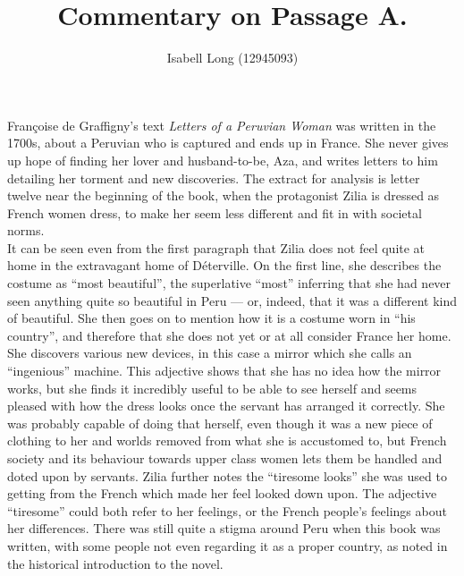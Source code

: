 \documentclass[12pt,a4paper]{article}
\begin{document}
\title{Commentary on Passage A.}
\author{Isabell Long (12945093)}
\maketitle

Françoise de Graffigny's text \textit{Letters of a Peruvian Woman} was written in the 1700s, about a Peruvian who is captured and ends up in France. She never gives up hope of finding her lover and husband-to-be, Aza, and writes letters to him detailing her torment and new discoveries. The extract for analysis is letter twelve near the beginning of the book, when the protagonist Zilia is dressed as French women dress, to make her seem less different and fit in with societal norms.\\

It can be seen even from the first paragraph that Zilia does not feel quite at home in the extravagant home of Déterville. On the first line, she describes the costume as ``most beautiful'', the superlative ``most'' inferring that she had never seen anything quite so beautiful in Peru --- or, indeed, that it was a different kind of beautiful. She then goes on to mention how it is a costume worn in ``his country'', and therefore that she does not yet or at all consider France her home. She discovers various new devices, in this case a mirror which she calls an ``ingenious'' machine. This adjective shows that she has no idea how the mirror works, but she finds it incredibly useful to be able to see herself and seems pleased with how the dress looks once the servant has arranged it correctly. She was probably capable of doing that herself, even though it was a new piece of clothing to her and worlds removed from what she is accustomed to, but French society and its behaviour towards upper class women lets them be handled and doted upon by servants. Zilia further notes the ``tiresome looks'' she was used to getting from the French which made her feel looked down upon. The adjective ``tiresome'' could both refer to her feelings, or the French people's feelings about her differences. There was still quite a stigma around Peru when this book was written, with some people not even regarding it as a proper country, as noted in the historical introduction to the novel.\\
\end{document}
